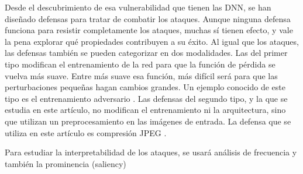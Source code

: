 Desde el descubrimiento de esa vulnerabilidad que tienen las DNN, se han diseñado defensas para tratar de combatir los ataques. Aunque ninguna defensa funciona para resistir completamente los ataques, muchas sí tienen efecto, y vale la pena explorar qué propiedades contribuyen a su éxito. Al igual que los ataques, las defensas también se pueden categorizar en dos modalidades. Las del primer tipo modifican el entrenamiento de la red para que la función de pérdida se vuelva más suave. Entre más suave esa función, más difícil será para que las perturbaciones pequeñas hagan cambios grandes. Un ejemplo conocido de este tipo es el entrenamiento adversario \cite{goodfellow2015explaining, Shaham_2018, szegedy2014intriguing}. Las defensas del segundo tipo, y la que se estudia en este artículo, no modifican el entrenamiento ni la arquitectura, sino que utilizan un preprocesamiento en las imágenes de entrada. La defensa que se utiliza en este artículo es compresión JPEG \cite{das2017keeping}.

Para estudiar la interpretabilidad de los ataques, se usará análisis de frecuencia y también la prominencia (saliency) \cite{simonyan2014deep}




